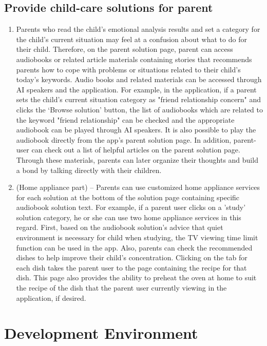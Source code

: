 \documentclass[conference]{IEEEtran}
\begin{document}
\subsection{Provide child-care solutions for parent}

\begin{enumerate}
\item Parents who read the child's emotional analysis results and set a category for the child's current situation may feel at a confusion about what to do for their child. Therefore, on the parent solution page, parent can access audiobooks or related article materials containing stories that recommends parents how to cope with problems or situations related to their child's today’s keywords. Audio books and related materials can be accessed through AI speakers and the application. For example, in the application, if a parent sets the child's current situation category as "friend relationship concern" and clicks the ‘Browse solution’ button, the list of audiobooks which are related to the keyword "friend relationship" can be checked and the appropriate audiobook can be played through AI speakers. It is also possible to play the audiobook directly from the app's parent solution page. In addition, parent-user can check out a list of helpful articles on the parent solution page. Through these materials, parents can later organize their thoughts and build a bond by talking directly with their children.


  \item (Home appliance part) – Parents can use customized home appliance services for each solution at the bottom of the solution page containing specific audiobook solution text. For example, if a parent user clicks on a 'study' solution category, he or she can use two home appliance services in this regard. First, based on the audiobook solution's advice that quiet environment is necessary for child when studying, the TV viewing time limit function can be used in the app. Also, parents can check the recommended dishes to help improve their child's concentration. Clicking on the tab for each dish takes the parent user to the page containing the recipe for that dish. This page also provides the ability to preheat the oven at home to suit the recipe of the dish that the parent user currently viewing in the application, if desired.
  
\end{enumerate}
\newpage
\section{\large{Development Environment}}
\end{document}
